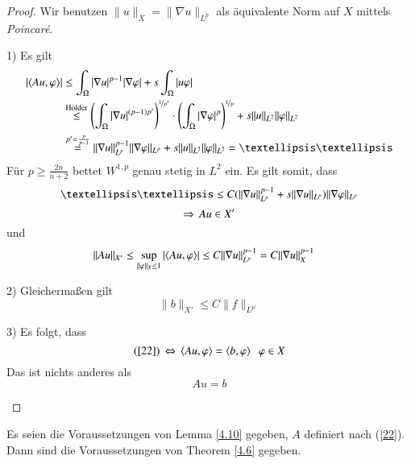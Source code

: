 \begin{proof}
    Wir benutzen $\|u\|_X=\|\nabla u \|_{L^p}$ als äquivalente Norm auf $X$ mittels \textit{Poincaré}.
    \begin{description}
        \item{1)}
        Es gilt
        \begin{align*}
            |\lal Au,\vp \ral| &\leq \int_\Omega |\nabla u |^{p-1}|\nabla \vp| + s\int_\Omega |u\vp|\\
            &\overset{\text{Hölder}}{\leq} \left( \int_\Omega |\nabla u|^{(p-1)p'} \right)
            ^{\nicefrac1{p'}}\cdot \left( \int_\Omega |\nabla \vp|^p \right)^{\nicefrac 1p}
            +s \|u\|_{L^2}\|\vp\|_{L^2}\\
            &\overset{p'=\frac{p}{p-1}}{=} \|\nabla u\|_{L^p}^{p-1} \|\nabla \vp\|_{L^p} +
            s \|u\|_{L^2}\|\vp\|_{L^2}= ……
        \end{align*}
        Für $p\geq \frac{2n}{n+2}$ bettet $W^{1,p}$ genau stetig in $L^2$ ein. Es gilt somit, dass
        \[
            ……\leq C (\|\nabla u \|_{L^p}^{p-1}+s\|\nabla u\|_{L^p})\|\nabla\vp\|_{L^p}
        \]
        \[
            \Rightarrow \, Au\in X'
        \]
        und
        \begin{align*}
            \|Au\|_{X'}&\leq \sup_{\|\varphi\|_X\leq1} |\langle Au,\varphi \rangle| \leq C \|\nabla u\|_{L^p}^{p-1}
            =C\|\nabla u\|_X^{p-1}
        \end{align*}
        \item{2)}
        Gleichermaßen gilt
        \[
            \|b\|_{X'} \leq C\|f\|_{L^{p'}}
        \]
        \item{3)}
        Es folgt, dass
        \[
            (\ref{22}) \, \Leftrightarrow \, \langle Au,\varphi\rangle= \langle b,\varphi\rangle \hspace{.25cm} \varphi \in X
        \]
        Das ist nichts anderes als
        \[
            Au=b
        \]
    \end{description}\[ \]
\end{proof}

\begin{lem}\label{4.11}
    Es seien die Voraussetzungen von Lemma \ref{4.10} gegeben, $A$ definiert nach (\ref{22}). Dann sind
    die Voraussetzungen von Theorem \ref{4.6} gegeben.
\end{lem}

